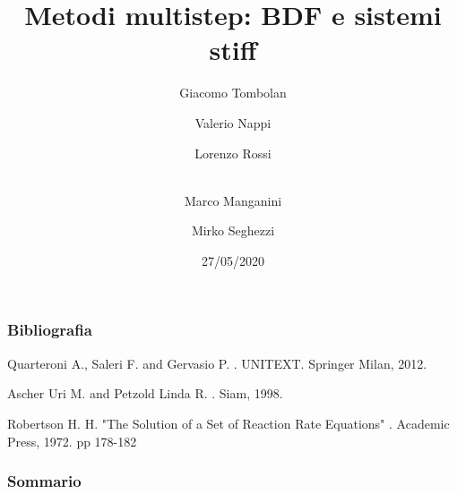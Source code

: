 \documentclass[aspectratio=169, 10pt, handout,usenames,dvipsnames]{beamer}
\begin{document}
\begin{frame}
  \title{Metodi multistep: BDF e sistemi stiff}
  
  \date{27/05/2020}
  \author{Giacomo Tombolan \and Valerio Nappi \and 
          Lorenzo Rossi \and  \\Marco Manganini \and
          Mirko Seghezzi}
  \maketitle
\end{frame}


\begin{frame}


  \frametitle{Bibliografia}
  \begin{thebibliography}{99}\small
    
    Quarteroni A., Saleri F. and Gervasio P.
    .
    \newblock UNITEXT. Springer Milan, 2012.

    Ascher Uri M. and Petzold Linda R.
    .
    \newblock Siam, 1998.

    Robertson H. H. "The Solution of a Set of Reaction Rate Equations"
    .
    \newblock Academic Press, 1972. pp 178-182
  

   \end{thebibliography}

  
\end{frame}  




\begin{frame}
  \frametitle{Sommario}
  \tableofcontents
\end{frame}
\end{document}
